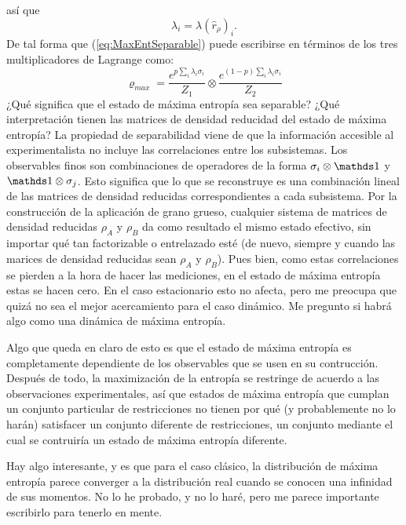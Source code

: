 así que
\begin{equation*}
  \lambda_{i}=\lambda(\hat{r}_{\rho})_{i}.
\end{equation*}
De tal forma que (\ref{eq:MaxEntSeparable}) puede escribirse en términos de los tres multiplicadores de Lagrange como:
\begin{equation*}
\varrho_{max}=\frac{e^{p\sum_{i}\lambda_{i}\sigma_{i}}}{Z_{1}} \otimes \frac{e^{(1-p)\sum_{i}\lambda_{i}\sigma_{i}}}{Z_{2}}
\end{equation*}
¿Qué significa que el estado de máxima entropía sea separable? ¿Qué interpretación tienen las matrices de densidad reducidad del estado de máxima entropía? La propiedad de separabilidad viene de que la información accesible al experimentalista no incluye las correlaciones entre los subsistemas. Los observables finos son combinaciones de operadores de la forma $\pauli{i}\otimes\Id$ y $\Id\otimes\pauli{j}$. Esto significa que lo que se reconstruye es una combinación lineal de las matrices de densidad reducidas correspondientes a cada subsistema. Por la construcción de la aplicación de grano grueso, cualquier sistema de matrices de densidad reducidas $\rho_{A}$ y $\rho_{B}$ da como resultado el mismo estado efectivo, sin importar qué tan factorizable o entrelazado esté (de nuevo, siempre y cuando las marices de densidad reducidas sean $\rho_{A}$ y $\rho_{B}$). Pues bien, como estas correlaciones se pierden a la hora de hacer las mediciones, en el estado de máxima entropía estas se hacen cero. En el caso estacionario esto no afecta, pero me preocupa que quizá no sea el mejor acercamiento para el caso dinámico. Me pregunto si habrá algo como una dinámica de máxima entropía. 

Algo que queda en claro de esto es que el estado de máxima entropía es completamente dependiente de los observables que se usen en su contrucción. Después de todo, la maximización de la entropía se restringe de acuerdo a las observaciones experimentales, así que estados de máxima entropía que cumplan un conjunto particular de restricciones no tienen por qué (y probablemente no lo harán) satisfacer un conjunto diferente de restricciones, un conjunto mediante el cual se contruiría un estado de máxima entropía diferente.

Hay algo interesante, y es que para el caso clásico, la distribución de máxima entropía parece converger a la distribución real cuando se conocen una infinidad de sus momentos. No lo he probado, y no lo haré, pero me parece importante escribirlo para tenerlo en mente.

